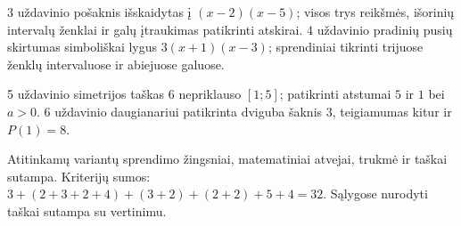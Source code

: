 \documentclass[11pt]{article}
\begin{document}
3 uždavinio pošaknis išskaidytas į $(x-2)(x-5)$; visos trys reikšmės, išorinių intervalų ženklai ir galų įtraukimas patikrinti atskirai. 4 uždavinio pradinių pusių skirtumas simboliškai lygus $3(x+1)(x-3)$; sprendiniai tikrinti trijuose ženklų intervaluose ir abiejuose galuose.

5 uždavinio simetrijos taškas $6$ nepriklauso $[1;5]$; patikrinti atstumai $5$ ir $1$ bei $a>0$. 6 uždavinio daugianariui patikrinta dviguba šaknis $3$, teigiamumas kitur ir $P(1)=8$.

Atitinkamų variantų sprendimo žingsniai, matematiniai atvejai, trukmė ir taškai sutampa. Kriterijų sumos: $3+(2+3+2+4)+(3+2)+(2+2)+5+4=32$. Sąlygose nurodyti taškai sutampa su vertinimu.
\end{document}
